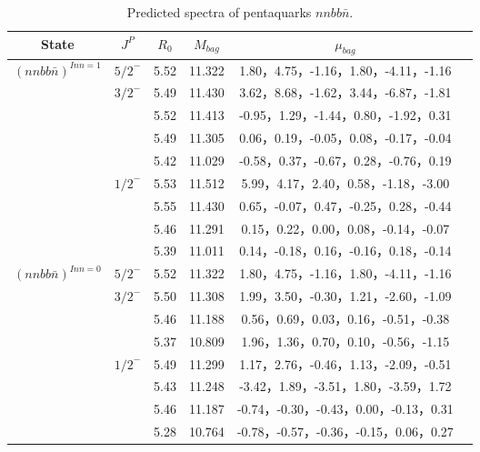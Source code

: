 \documentclass[prd,twocolumn,floatfix,nofootinbib]{revtex4}
\begin{document}
\renewcommand{\tabcolsep}{0.5cm}
\renewcommand{\arraystretch}{1.2}

   
\begin{table*}[!htbp]
    \caption{Predicted spectra of pentaquarks $nnbb\bar{n}$.}
    \begin{tabular}{cccccc}
        \hline\hline
        {\rm State} &$J^{P}$ &$R_{0}$ &$M_{bag}$ &$\mu_{bag}$  \\ \hline
        ${(nnbb\bar{n})}^{I{nn}=1}$
            &${5/2}^{-}$     &5.52   &11.322 &1.80，4.75，-1.16，1.80，-4.11，-1.16  \\                
            &${3/2}^{-}$     &5.49   &11.430 &3.62，8.68，-1.62，3.44，-6.87，-1.81 \\
                         &$ $     &5.52   &11.413 &-0.95，1.29，-1.44，0.80，-1.92，0.31  \\
                         &$ $     &5.49   &11.305 &0.06，0.19，-0.05，0.08，-0.17，-0.04  \\
                         &$ $     &5.42   &11.029 &-0.58，0.37，-0.67，0.28，-0.76，0.19 \\
            &${1/2}^{-}$     &5.53   &11.512 &5.99，4.17，2.40，0.58，-1.18，-3.00  \\
                         &$ $     &5.55   &11.430 &0.65，-0.07，0.47，-0.25，0.28，-0.44  \\
                         &$ $     &5.46   &11.291 &0.15，0.22，0.00，0.08，-0.14，-0.07  \\
                         &$ $     &5.39   &11.011 &0.14，-0.18，0.16，-0.16，0.18，-0.14 \\
            ${(nnbb\bar{n})}^{I{nn}=0}$
            &${5/2}^{-}$     &5.52   &11.322 &1.80，4.75，-1.16，1.80，-4.11，-1.16  \\                
            &${3/2}^{-}$     &5.50   &11.308 &1.99，3.50，-0.30，1.21，-2.60，-1.09 \\
                         &$ $     &5.46   &11.188 &0.56，0.69，0.03，0.16，-0.51，-0.38  \\
                         &$ $     &5.37   &10.809 &1.96，1.36，0.70，0.10，-0.56，-1.15  \\
            &${1/2}^{-}$     &5.49   &11.299 &1.17，2.76，-0.46，1.13，-2.09，-0.51  \\
                         &$ $     &5.43   &11.248 &-3.42，1.89，-3.51，1.80，-3.59，1.72  \\
                         &$ $     &5.46   &11.187 &-0.74，-0.30，-0.43，0.00，-0.13，0.31 \\
                         &$ $     &5.28   &10.764 &-0.78，-0.57，-0.36，-0.15，0.06，0.27 \\
       \hline\hline
    \end{tabular}
\end{table*}
\end{document}
